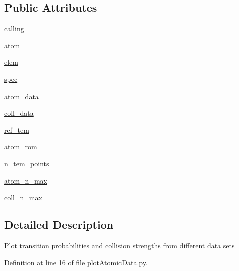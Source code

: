 \subsection*{Public Attributes}
\begin{DoxyCompactItemize}
\item 
\hyperlink{classpyneb_1_1plot_1_1plot_atomic_data_1_1_data_plot_a393a133b607541c57d5ebc5a34687e3f}{calling}
\item 
\hyperlink{classpyneb_1_1plot_1_1plot_atomic_data_1_1_data_plot_af5bbbf002544d1336f7f673a6e777f2e}{atom}
\item 
\hyperlink{classpyneb_1_1plot_1_1plot_atomic_data_1_1_data_plot_ae936c57b93cc86a5cf28f8838164940a}{elem}
\item 
\hyperlink{classpyneb_1_1plot_1_1plot_atomic_data_1_1_data_plot_acaaca83a6e12e99ebc1da72af5f8c60a}{spec}
\item 
\hyperlink{classpyneb_1_1plot_1_1plot_atomic_data_1_1_data_plot_aee33ad460a38cb4293a5bd89cec12294}{atom\+\_\+data}
\item 
\hyperlink{classpyneb_1_1plot_1_1plot_atomic_data_1_1_data_plot_a50a9af3695633a64c66d082ed67d1bfb}{coll\+\_\+data}
\item 
\hyperlink{classpyneb_1_1plot_1_1plot_atomic_data_1_1_data_plot_aa260990b7c3556dc48741f6ae9516894}{ref\+\_\+tem}
\item 
\hyperlink{classpyneb_1_1plot_1_1plot_atomic_data_1_1_data_plot_a334c448311ed9dc8cd700af504e06254}{atom\+\_\+rom}
\item 
\hyperlink{classpyneb_1_1plot_1_1plot_atomic_data_1_1_data_plot_a9f92ae121756c0e3d3624f11e3d2ae17}{n\+\_\+tem\+\_\+points}
\item 
\hyperlink{classpyneb_1_1plot_1_1plot_atomic_data_1_1_data_plot_a668572cfe9a684e7195535d60d343938}{atom\+\_\+n\+\_\+max}
\item 
\hyperlink{classpyneb_1_1plot_1_1plot_atomic_data_1_1_data_plot_aa15b01aa8da5eac903d797c2a1af3461}{coll\+\_\+n\+\_\+max}
\end{DoxyCompactItemize}


\subsection{Detailed Description}
\begin{DoxyVerb}Plot transition probabilities and collision strengths from different data sets\end{DoxyVerb}
 

Definition at line \hyperlink{plot_atomic_data_8py_source_l00016}{16} of file \hyperlink{plot_atomic_data_8py_source}{plot\+Atomic\+Data.\+py}.



